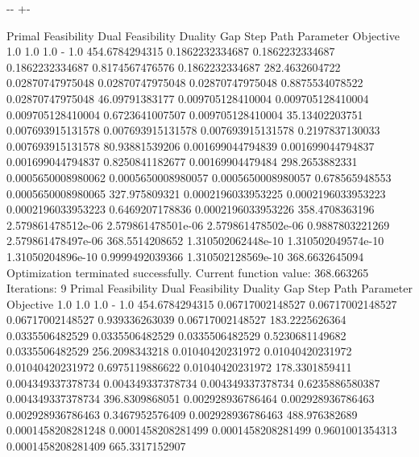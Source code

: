 \documentclass[letterpaper,10pt,english]{sphinxmanual}
\newlength\nbsphinxcodecellspacing
\begin{document}
{

\kern-\sphinxverbatimsmallskipamount\kern-\baselineskip
\kern+\FrameHeightAdjust\kern-\fboxrule
\vspace{\nbsphinxcodecellspacing}

\begin{sphinxVerbatim}[commandchars=\\\{\}]
Primal Feasibility  Dual Feasibility    Duality Gap         Step             Path Parameter      Objective
1.0                 1.0                 1.0                 -                1.0                 454.6784294315
0.1862232334687     0.1862232334687     0.1862232334687     0.8174567476576  0.1862232334687     282.4632604722
0.02870747975048    0.02870747975048    0.02870747975048    0.8875534078522  0.02870747975048    46.09791383177
0.009705128410004   0.009705128410004   0.009705128410004   0.6723641007507  0.009705128410004   35.13402203751
0.007693915131578   0.007693915131578   0.007693915131578   0.2197837130033  0.007693915131578   80.93881539206
0.001699044794839   0.001699044794837   0.001699044794837   0.8250841182677  0.00169904479484    298.2653882331
0.0005650008980062  0.0005650008980057  0.0005650008980057  0.678565948553   0.0005650008980065  327.975809321
0.0002196033953225  0.0002196033953223  0.0002196033953223  0.6469207178836  0.0002196033953226  358.4708363196
2.579861478512e-06  2.579861478501e-06  2.579861478502e-06  0.9887803221269  2.579861478497e-06  368.5514208652
1.310502062448e-10  1.310502049574e-10  1.31050204896e-10   0.9999492039366  1.310502128569e-10  368.6632645094
Optimization terminated successfully.
         Current function value: 368.663265
         Iterations: 9
Primal Feasibility  Dual Feasibility    Duality Gap         Step             Path Parameter      Objective
1.0                 1.0                 1.0                 -                1.0                 454.6784294315
0.06717002148527    0.06717002148527    0.06717002148527    0.939336263039   0.06717002148527    183.2225626364
0.0335506482529     0.0335506482529     0.0335506482529     0.5230681149682  0.0335506482529     256.2098343218
0.01040420231972    0.01040420231972    0.01040420231972    0.6975119886622  0.01040420231972    178.3301859411
0.004349337378734   0.004349337378734   0.004349337378734   0.6235886580387  0.004349337378734   396.8309868051
0.002928936786464   0.002928936786463   0.002928936786463   0.3467952576409  0.002928936786463   488.976382689
0.0001458208281248  0.0001458208281499  0.0001458208281499  0.9601001354313  0.0001458208281409  665.3317152907

\end{sphinxVerbatim}}
\end{document}
